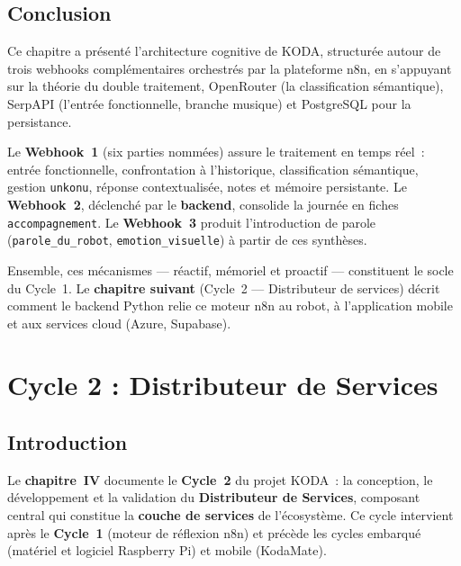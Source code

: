 \documentclass[a4paper,12pt]{report}
\begin{document}
	\section{Conclusion}
	
	
	Ce chapitre a présenté l'architecture cognitive de KODA, structurée autour de trois
	webhooks complémentaires orchestrés par la plateforme n8n, en s'appuyant sur la
	théorie du double traitement, OpenRouter (la classification sémantique), SerpAPI (l'entrée fonctionnelle, branche musique)
	et PostgreSQL pour la persistance.
	
	Le \textbf{Webhook~1} (six parties nommées) assure le traitement en temps réel~:
	entrée fonctionnelle, confrontation à l'historique, classification sémantique,
	gestion \texttt{unkonu}, réponse contextualisée, notes et mémoire persistante.
	Le \textbf{Webhook~2}, déclenché par le \textbf{backend}, consolide la journée en
	fiches \texttt{accompagnement}. Le \textbf{Webhook~3} produit l'introduction de parole
	(\texttt{parole\_du\_robot}, \texttt{emotion\_visuelle}) à partir de ces synthèses.
	
	Ensemble, ces mécanismes — réactif, mémoriel et proactif — constituent le socle du
	Cycle~1. Le \textbf{chapitre suivant} (Cycle~2 --- Distributeur de services) décrit
	comment le backend Python relie ce moteur n8n au robot, à l'application mobile et aux
	services cloud (Azure, Supabase).
	\chapter{Cycle 2 : Distributeur de Services}
	
	\section{Introduction}
	
	Le \textbf{chapitre~IV} documente le \textbf{Cycle~2} du projet KODA~: la conception,
	le développement et la validation du \textbf{Distributeur de Services}, composant
	central qui constitue la \textbf{couche de services} de l'écosystème. Ce cycle
	intervient après le \textbf{Cycle~1} (moteur de réflexion n8n) et précède les cycles
	embarqué (matériel et logiciel Raspberry Pi) et mobile (KodaMate).
	
\end{document}
